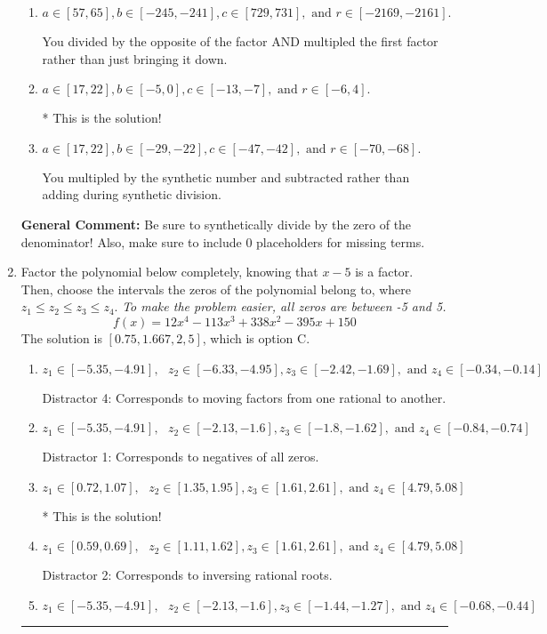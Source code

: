 \documentclass{extbook}[14pt]
\newcommand{\litem}[1]{\item #1

\rule{\textwidth}{0.4pt}}
\begin{document}
\begin{enumerate}
{\begin{enumerate}[label=\Alph*.]
 You divided by the opposite of the factor.
\item \( a \in [57, 65], b \in [-245, -241], c \in [729, 731], \text{ and } r \in [-2169, -2161]. \)

 You divided by the opposite of the factor AND multipled the first factor rather than just bringing it down.
\item \( a \in [17, 22], b \in [-5, 0], c \in [-13, -7], \text{ and } r \in [-6, 4]. \)

* This is the solution!
\item \( a \in [17, 22], b \in [-29, -22], c \in [-47, -42], \text{ and } r \in [-70, -68]. \)

 You multipled by the synthetic number and subtracted rather than adding during synthetic division.
\end{enumerate}

\textbf{General Comment:} Be sure to synthetically divide by the zero of the denominator! Also, make sure to include 0 placeholders for missing terms.
}
\litem{
Factor the polynomial below completely, knowing that $x -5$ is a factor. Then, choose the intervals the zeros of the polynomial belong to, where $z_1 \leq z_2 \leq z_3 \leq z_4$. \textit{To make the problem easier, all zeros are between -5 and 5.}
\[ f(x) = 12x^{4} -113 x^{3} +338 x^{2} -395 x + 150 \]The solution is \( [0.75, 1.667, 2, 5] \), which is option C.\begin{enumerate}[label=\Alph*.]
\item \( z_1 \in [-5.35, -4.91], \text{   }  z_2 \in [-6.33, -4.95], z_3 \in [-2.42, -1.69], \text{   and   } z_4 \in [-0.34, -0.14] \)

 Distractor 4: Corresponds to moving factors from one rational to another.
\item \( z_1 \in [-5.35, -4.91], \text{   }  z_2 \in [-2.13, -1.6], z_3 \in [-1.8, -1.62], \text{   and   } z_4 \in [-0.84, -0.74] \)

 Distractor 1: Corresponds to negatives of all zeros.
\item \( z_1 \in [0.72, 1.07], \text{   }  z_2 \in [1.35, 1.95], z_3 \in [1.61, 2.61], \text{   and   } z_4 \in [4.79, 5.08] \)

* This is the solution!
\item \( z_1 \in [0.59, 0.69], \text{   }  z_2 \in [1.11, 1.62], z_3 \in [1.61, 2.61], \text{   and   } z_4 \in [4.79, 5.08] \)

 Distractor 2: Corresponds to inversing rational roots.
\item \( z_1 \in [-5.35, -4.91], \text{   }  z_2 \in [-2.13, -1.6], z_3 \in [-1.44, -1.27], \text{   and   } z_4 \in [-0.68, -0.44] \)


\end{enumerate}}
\end{enumerate}
\end{document}
